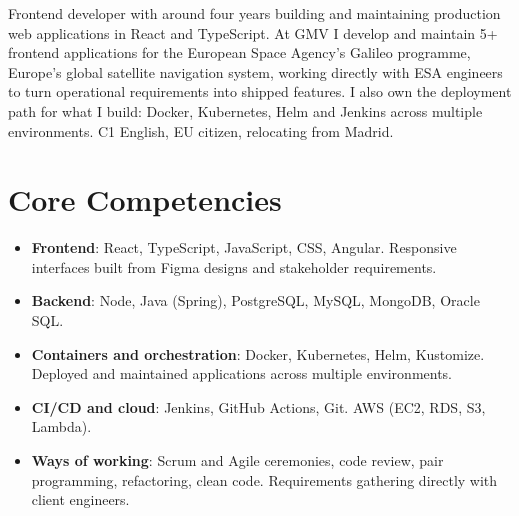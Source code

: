 \documentclass[11pt,a4paper,sans]{moderncv}
\begin{document}
\makecvtitle


\vspace{6pt}
\small{Frontend developer with around four years building and maintaining production web applications in React and TypeScript. At GMV I develop and maintain 5+ frontend applications for the European Space Agency's Galileo programme, Europe's global satellite navigation system, working directly with ESA engineers to turn operational requirements into shipped features. I also own the deployment path for what I build: Docker, Kubernetes, Helm and Jenkins across multiple environments. C1 English, EU citizen, relocating from Madrid.}


\section{Core Competencies}
\vspace{1pt}
\begin{itemize}

\item \textbf{Frontend}: React, TypeScript, JavaScript, CSS, Angular. Responsive interfaces built from Figma designs and stakeholder requirements.

\item \textbf{Backend}: Node, Java (Spring), PostgreSQL, MySQL, MongoDB, Oracle SQL.

\item \textbf{Containers and orchestration}: Docker, Kubernetes, Helm, Kustomize. Deployed and maintained applications across multiple environments.

\item \textbf{CI/CD and cloud}: Jenkins, GitHub Actions, Git. AWS (EC2, RDS, S3, Lambda).

\item \textbf{Ways of working}: Scrum and Agile ceremonies, code review, pair programming, refactoring, clean code. Requirements gathering directly with client engineers.

\end{itemize}

\end{document}

